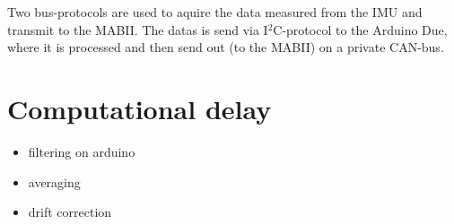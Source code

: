 \documentclass[ExampleMasters.tex]{subfiles}
\begin{document}
Two bus-protocols are used to aquire the data measured from the IMU and transmit  to the MABII. The datas is send via I$^2$C-protocol to the Arduino Due, where it is processed and then send out (to the MABII) on a private CAN-bus. 

\section{Computational delay}
\label{sec:computational_delay}
\begin{itemize}
	\item filtering on arduino
	\item averaging
	\item drift correction
	
\end{itemize}
\end{document}
